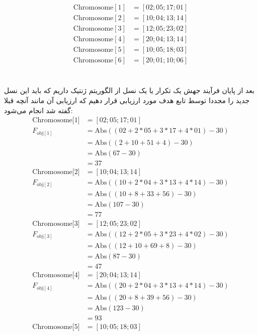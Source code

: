 \documentclass[11pt]{article}
\begin{document}
\[
\begin{array}{ll}
\text{Chromosome}[1] & = [02;05;17;01] \\
\text{Chromosome}[2] & = [10;04;13;14] \\
\text{Chromosome}[3] & = [12;05;23;02] \\
\text{Chromosome}[4] & = [20;04;13;14] \\
\text{Chromosome}[5] & = [10;05;18;03] \\
\text{Chromosome}[6] & = [20;01;10;06]
\end{array}
\]
\\
\\
بعد از پایان فرآیند جهش یک تکرار یا یک نسل از الگوریتم ژنتیک داریم که باید این نسل جدید را مجددا توسط تابع هدف مورد ارزیابی قرار دهیم که ارزیابی آن مانند آنچه قبلا گفته شد انجام می‌شود:
\[
\begin{array}{ll}
\text{Chromosome[1]} & = [02;05;17;01] \\
F_{\text{obj}[1]} & = \text{Abs}\left((02 + 2*05 + 3*17 + 4*01) - 30\right) \\
& = \text{Abs}\left((2 + 10 + 51 + 4) - 30\right) \\
& = \text{Abs}(67 - 30) \\
& = 37 \\
\text{Chromosome[2]} & = [10;04;13;14] \\
F_{\text{obj}[2]} & = \text{Abs}\left((10 + 2*04 + 3*13 + 4*14) - 30\right) \\
& = \text{Abs}\left((10 + 8 + 33 + 56) - 30\right) \\
& = \text{Abs}(107 - 30) \\
& = 77 \\
\text{Chromosome[3]} & = [12;05;23;02] \\
F_{\text{obj}[3]} & = \text{Abs}\left((12 + 2*05 + 3*23 + 4*02) - 30\right) \\
& = \text{Abs}\left((12 + 10 + 69 + 8) - 30\right) \\
& = \text{Abs}(87 - 30) \\
& = 47 \\
\text{Chromosome[4]} & = [20;04;13;14] \\
F_{\text{obj}[4]} & = \text{Abs}\left((20 + 2*04 + 3*13 + 4*14) - 30\right) \\
& = \text{Abs}\left((20 + 8 + 39 + 56) - 30\right) \\
& = \text{Abs}(123 - 30) \\
& = 93 \\
\text{Chromosome[5]} & = [10;05;18;03] \\

\end{array}\]
\end{document}
